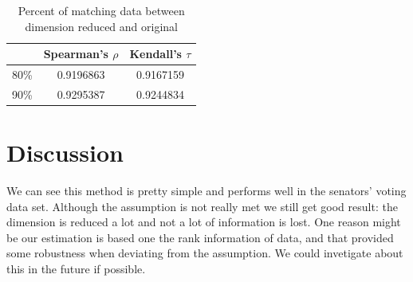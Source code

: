 \documentclass{article}
\theoremstyle{definition}
\begin{document}
	\begin{table}[!htb]
		 	\caption{Percent of matching data between dimension reduced and original}
		 	\label{matching}
		 	\centering
		 	\begin{tabular}{ccc}
		 	\toprule
		 	& Spearman's $\rho$ & Kendall's $\tau$\\
		 	\midrule
		 	80\% & 0.9196863 & 0.9167159\\
		 	90\% & 0.9295387 & 0.9244834\\
		 	\bottomrule
		 	\end{tabular}
		 \end{table}

	\section{Discussion}
	We can see this method is pretty simple and performs well in the senators' voting data set. Although the assumption is not really met we still get good result: the dimension is reduced a lot and not a lot of information is lost. One reason might be our estimation is based one the rank information of data, and that provided some robustness when deviating from the assumption. We could invetigate about this in the future if possible.
\end{document}
